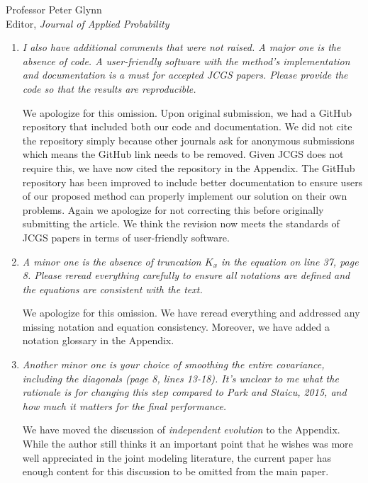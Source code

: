 \documentclass[11pt]{letter} %
\begin{document}
\begin{letter}{Professor
	Peter Glynn\\
	Editor, {\em Journal of Applied Probability}}
\begin{enumerate}
\item {\it I also have additional comments that were not raised. A major one is the absence of code. A user-friendly software with the method’s implementation and documentation is a must for accepted JCGS papers. Please provide the code so that the results are reproducible.}

\vspace{5mm}
We apologize for this omission.  Upon original submission, we had a GitHub repository that included both our code and documentation.  We did not cite the repository simply because other journals ask for anonymous submissions which means the GitHub link needs to be removed.  Given JCGS does not require this, we have now cited the repository in the Appendix.  The GitHub repository has been improved to include better documentation to ensure users of our proposed method can properly implement our solution on their own problems. Again we apologize for not correcting this before originally submitting the article. We think the revision now meets the standards of JCGS papers in terms of user-friendly software.
\vspace{5mm}

\item {\it
A minor one is the absence of truncation $K_x$ in the equation on line 37, page 8. Please reread everything carefully to ensure all notations are defined and the equations are consistent with the text.}

\vspace{5mm}
We apologize for this omission. We have reread everything and addressed any missing notation and equation consistency.  Moreover, we have added a notation glossary in the Appendix.
\vspace{5mm}

\item {\it Another minor one is your choice of smoothing the entire covariance, including the diagonals (page 8, lines 13-18). It’s unclear to me what the rationale is for changing this step compared to Park and Staicu, 2015, and how much it matters for the final performance.}

\vspace{5mm}
We have moved the discussion of \emph{independent evolution} to the Appendix.  While the author still thinks it an important point that he wishes was more well appreciated in the joint modeling literature, the current paper has enough content for this discussion to be omitted from the main paper.
\vspace{5mm}


\end{enumerate}
\end{letter}
\end{document}
